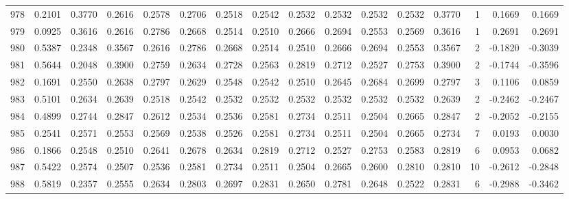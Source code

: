 \begin{tabular}{lrrrrrrrrrrrrrrr}
978 &      0.2101 &  0.3770 &  0.2616 &  0.2578 &  0.2706 &  0.2518 &  0.2542 &  0.2532 &  0.2532 &  0.2532 &   0.2532 &     0.3770 &      1 &                    0.1669 &                     0.1669 \\
979 &      0.0925 &  0.3616 &  0.2616 &  0.2786 &  0.2668 &  0.2514 &  0.2510 &  0.2666 &  0.2694 &  0.2553 &   0.2569 &     0.3616 &      1 &                    0.2691 &                     0.2691 \\
980 &      0.5387 &  0.2348 &  0.3567 &  0.2616 &  0.2786 &  0.2668 &  0.2514 &  0.2510 &  0.2666 &  0.2694 &   0.2553 &     0.3567 &      2 &                   -0.1820 &                    -0.3039 \\
981 &      0.5644 &  0.2048 &  0.3900 &  0.2759 &  0.2634 &  0.2728 &  0.2563 &  0.2819 &  0.2712 &  0.2527 &   0.2753 &     0.3900 &      2 &                   -0.1744 &                    -0.3596 \\
982 &      0.1691 &  0.2550 &  0.2638 &  0.2797 &  0.2629 &  0.2548 &  0.2542 &  0.2510 &  0.2645 &  0.2684 &   0.2699 &     0.2797 &      3 &                    0.1106 &                     0.0859 \\
983 &      0.5101 &  0.2634 &  0.2639 &  0.2518 &  0.2542 &  0.2532 &  0.2532 &  0.2532 &  0.2532 &  0.2532 &   0.2532 &     0.2639 &      2 &                   -0.2462 &                    -0.2467 \\
984 &      0.4899 &  0.2744 &  0.2847 &  0.2612 &  0.2534 &  0.2536 &  0.2581 &  0.2734 &  0.2511 &  0.2504 &   0.2665 &     0.2847 &      2 &                   -0.2052 &                    -0.2155 \\
985 &      0.2541 &  0.2571 &  0.2553 &  0.2569 &  0.2538 &  0.2526 &  0.2581 &  0.2734 &  0.2511 &  0.2504 &   0.2665 &     0.2734 &      7 &                    0.0193 &                     0.0030 \\
986 &      0.1866 &  0.2548 &  0.2510 &  0.2641 &  0.2678 &  0.2634 &  0.2819 &  0.2712 &  0.2527 &  0.2753 &   0.2583 &     0.2819 &      6 &                    0.0953 &                     0.0682 \\
987 &      0.5422 &  0.2574 &  0.2507 &  0.2536 &  0.2581 &  0.2734 &  0.2511 &  0.2504 &  0.2665 &  0.2600 &   0.2810 &     0.2810 &     10 &                   -0.2612 &                    -0.2848 \\
988 &      0.5819 &  0.2357 &  0.2555 &  0.2634 &  0.2803 &  0.2697 &  0.2831 &  0.2650 &  0.2781 &  0.2648 &   0.2522 &     0.2831 &      6 &                   -0.2988 &                    -0.3462 \\

\end{tabular}
